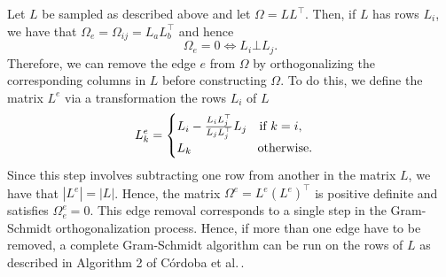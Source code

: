 Let $L$ be sampled as described above and let $\Omega = L L^\top$. Then, if $L$ has rows $L_i$, we have that $\Omega_e = \Omega_{ij} = L_a L_b^\top$ and hence
\begin{equation*}
    \Omega_e = 0 \Leftrightarrow L_i \bot L_j.
\end{equation*}
Therefore, we can remove the edge $e$ from $\Omega$ by orthogonalizing the corresponding columns in $L$ before constructing $\Omega$. To do this, we define the matrix $L^e$ via a transformation the rows $L_i$ of $L$
\begin{equation*}
    L^e_k = \begin{cases}
        L_i - \frac{L_i L_j^\top}{L_j L_j^\top} L_j \ \ {\textrm{ if }} k = i,\\
        L_k \ \ \ \ \ \ \ \ \ \ \ \ \ \ \ {\textrm{ otherwise}}.
    \end{cases}
\end{equation*}
Since this step involves subtracting one row from another in the matrix $L$, we have that $|L^e| = |L|$. Hence, the matrix $\Omega^e = L^e (L^e)^\top$ is positive definite and satisfies $\Omega^e_e = 0$. This edge removal corresponds to a single step in the Gram-Schmidt orthogonalization process. Hence, if more than one edge have to be removed, a complete Gram-Schmidt algorithm can be run on the rows of $L$ as described in Algorithm 2 of C\'ordoba et al.\,\cite{cordoba2020generating}.